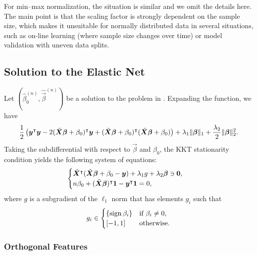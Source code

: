 For min--max normalization, the situation is similar and we omit the details here. The main
point is that the scaling factor is strongly dependent on the sample size, which makes it
unsuitable for normally distributed data in several situations, such as on-line learning
(where sample size changes over time) or model validation with uneven data splits.

\subsection{Solution to the Elastic Net}%
\label{sec:elastic-net-estimator}

Let \((\hat{\beta}_0^{(n)}, \hat{\vec{\beta}}^{(n)})\) be a solution to the problem in
. Expanding the function, we have
\[
  \frac{1}{2}\left( \boldsymbol y^\intercal \boldsymbol y - 2(\tilde{\boldsymbol{X}}\boldsymbol{\beta} + \beta_0)^\intercal\boldsymbol{y} + (\tilde{\boldsymbol{X}}\boldsymbol{\beta} + \beta_0)^\intercal(\tilde{\boldsymbol{X}}\boldsymbol{\beta} + \beta_0)\right)
  + \lambda_1 \lVert \boldsymbol\beta \rVert_1 + \frac{\lambda_2}{2}\lVert \boldsymbol \beta \rVert_2^2.
\]
Taking the subdifferential with respect to \(\vec{\beta}\) and \(\beta_0\), the KKT
stationarity condition yields the following system of equations:
\begin{equation}
  \label{eq:kkt-elasticnet}
  \begin{cases}
    \tilde{\boldsymbol{X}}^\intercal(\tilde{\boldsymbol{X}}\boldsymbol{\beta} + \beta_0 - \boldsymbol{y}) + \lambda_1 g + \lambda_2 \boldsymbol\beta \ni \boldsymbol{0}, \\
    n \beta_0 + (\tilde{\boldsymbol{X}}\boldsymbol{\beta})^\intercal \boldsymbol{1} - \boldsymbol{y}^\intercal \boldsymbol{1} = 0,
  \end{cases}
\end{equation}
where \(g\) is a subgradient of the \(\ell_1\) norm that has elements \(g_i\) such that
\[
  g_i \in
  \begin{cases}
    \{\operatorname{sign}{\beta_i}\} & \text{if } \beta_i \neq 0, \\
    [-1, 1]            & \text{otherwise}.
  \end{cases}
\]

\subsubsection{Orthogonal Features}

